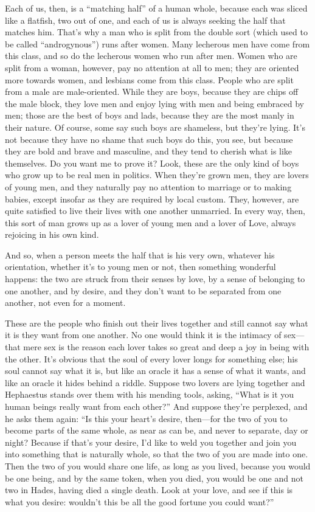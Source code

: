 Each of us, then, is a “matching half” of a human whole, because each
was sliced like a flatfish, two out of one, and each of us is always
seeking the half that matches him. That’s why a man who is split from
the double sort (which used to be called “androgynous”) runs after
women. Many  lecherous men have come from this class, and so do
the lecherous women who run after men. Women who are split from a woman,
however, pay no attention at all to men; they are oriented more towards
women, and lesbians come from this class. People who are split from a
male are male-oriented. While they are boys, because they are chips off
the male block, they love men and enjoy lying with men and being
embraced by men;  those are the best of boys and lads,
because they are the most manly in their nature. Of course, some say
such boys are shameless, but they’re lying. It’s not because they have
no shame that such boys do this, you see, but because they are bold and
brave and masculine, and they tend to cherish what is like themselves.
Do you want me to prove it? Look, these are the only kind of boys who
grow up to be real men in politics. When  they’re grown men, they
are lovers of young men, and they naturally pay no attention to marriage
or to making babies, except insofar as they are required by local
custom. They, however, are quite satisfied to live their lives with one
another unmarried. In every way, then, this sort of man grows up as a
lover of young men and a lover of Love, always rejoicing in his own
kind.

And so, when a person meets the half that is his very own, whatever his
orientation, whether it’s to young men or not, then something wonderful
happens: the two are struck from their senses by love, by a sense of
 belonging to one another, and by desire, and they don’t want to
be separated from one another, not even for a moment.

These are the people who finish out their lives together and still
cannot say what it is they want from one another. No one would think it
is the intimacy of sex---that mere sex is the reason each lover takes so
great and deep a joy in being with the other. It’s obvious that the soul
of every lover  longs for something else; his soul cannot say
what it is, but like an oracle it has a sense of what it wants, and like
an oracle it hides behind a riddle. Suppose two lovers are lying
together and
Hephaestus stands
over them with his mending tools, asking, “What is it you human beings
really want from each other?” And suppose they’re perplexed, and he asks
them again: “Is this your heart’s desire, then---for the two of you to
become parts of the same whole, as near as can be, and never to
separate, day or night? Because if that’s your desire, I’d like to weld
you together and join you into something that is naturally whole, so
that the two of you are made  into one. Then the two of you would
share one life, as long as you lived, because you would be one being,
and by the same token, when you died, you would be one and not two in
Hades, having died a single death. Look at your love, and see if this is
what you desire: wouldn’t this be all the good fortune you could want?”

